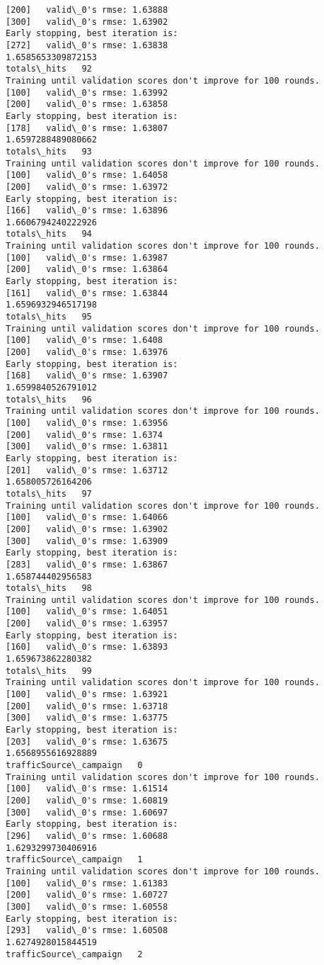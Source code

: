 \documentclass[11pt]{article}
\begin{document}
\begin{Verbatim}[commandchars=\\\{\}]
[200]	valid\_0's rmse: 1.63888
[300]	valid\_0's rmse: 1.63902
Early stopping, best iteration is:
[272]	valid\_0's rmse: 1.63838
1.6585653309872153
totals\_hits   92
Training until validation scores don't improve for 100 rounds.
[100]	valid\_0's rmse: 1.63992
[200]	valid\_0's rmse: 1.63858
Early stopping, best iteration is:
[178]	valid\_0's rmse: 1.63807
1.6597288489080662
totals\_hits   93
Training until validation scores don't improve for 100 rounds.
[100]	valid\_0's rmse: 1.64058
[200]	valid\_0's rmse: 1.63972
Early stopping, best iteration is:
[166]	valid\_0's rmse: 1.63896
1.6606794240222926
totals\_hits   94
Training until validation scores don't improve for 100 rounds.
[100]	valid\_0's rmse: 1.63987
[200]	valid\_0's rmse: 1.63864
Early stopping, best iteration is:
[161]	valid\_0's rmse: 1.63844
1.6596932946517198
totals\_hits   95
Training until validation scores don't improve for 100 rounds.
[100]	valid\_0's rmse: 1.6408
[200]	valid\_0's rmse: 1.63976
Early stopping, best iteration is:
[168]	valid\_0's rmse: 1.63907
1.6599840526791012
totals\_hits   96
Training until validation scores don't improve for 100 rounds.
[100]	valid\_0's rmse: 1.63956
[200]	valid\_0's rmse: 1.6374
[300]	valid\_0's rmse: 1.63811
Early stopping, best iteration is:
[201]	valid\_0's rmse: 1.63712
1.658005726164206
totals\_hits   97
Training until validation scores don't improve for 100 rounds.
[100]	valid\_0's rmse: 1.64066
[200]	valid\_0's rmse: 1.63902
[300]	valid\_0's rmse: 1.63909
Early stopping, best iteration is:
[283]	valid\_0's rmse: 1.63867
1.658744402956583
totals\_hits   98
Training until validation scores don't improve for 100 rounds.
[100]	valid\_0's rmse: 1.64051
[200]	valid\_0's rmse: 1.63957
Early stopping, best iteration is:
[160]	valid\_0's rmse: 1.63893
1.659673862280382
totals\_hits   99
Training until validation scores don't improve for 100 rounds.
[100]	valid\_0's rmse: 1.63921
[200]	valid\_0's rmse: 1.63718
[300]	valid\_0's rmse: 1.63775
Early stopping, best iteration is:
[203]	valid\_0's rmse: 1.63675
1.6568955616928889
trafficSource\_campaign   0
Training until validation scores don't improve for 100 rounds.
[100]	valid\_0's rmse: 1.61514
[200]	valid\_0's rmse: 1.60819
[300]	valid\_0's rmse: 1.60697
Early stopping, best iteration is:
[296]	valid\_0's rmse: 1.60688
1.6293299730406916
trafficSource\_campaign   1
Training until validation scores don't improve for 100 rounds.
[100]	valid\_0's rmse: 1.61383
[200]	valid\_0's rmse: 1.60727
[300]	valid\_0's rmse: 1.60558
Early stopping, best iteration is:
[293]	valid\_0's rmse: 1.60508
1.6274928015844519
trafficSource\_campaign   2

\end{Verbatim}
\end{document}

